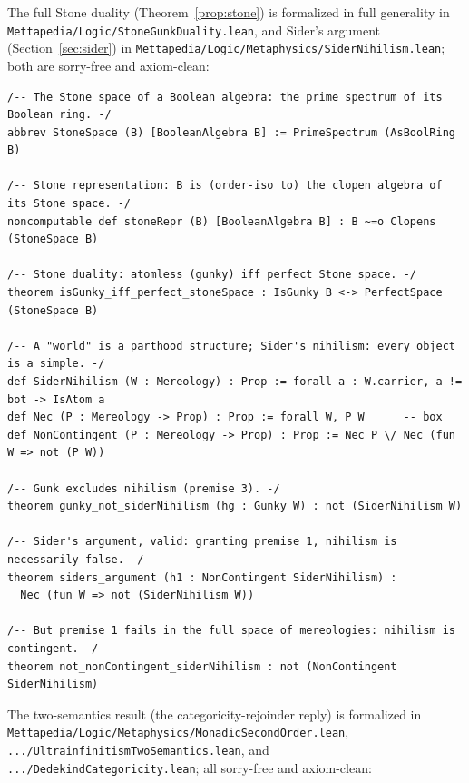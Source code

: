 \documentclass[]{article}
\theoremstyle{definition}
\theoremstyle{remark}
\newcommand{\lpath}[1]{{\ttfamily\nolinkurl{#1}}}
\begin{document}
\noindent The full Stone duality (Theorem~\ref{prop:stone}) is formalized in full
generality in \lpath{Mettapedia/Logic/StoneGunkDuality.lean}, and Sider's argument
(Section~\ref{sec:sider}) in \lpath{Mettapedia/Logic/Metaphysics/SiderNihilism.lean};
both are sorry-free and axiom-clean:

\begin{lstlisting}
/-- The Stone space of a Boolean algebra: the prime spectrum of its Boolean ring. -/
abbrev StoneSpace (B) [BooleanAlgebra B] := PrimeSpectrum (AsBoolRing B)

/-- Stone representation: B is (order-iso to) the clopen algebra of its Stone space. -/
noncomputable def stoneRepr (B) [BooleanAlgebra B] : B ~=o Clopens (StoneSpace B)

/-- Stone duality: atomless (gunky) iff perfect Stone space. -/
theorem isGunky_iff_perfect_stoneSpace : IsGunky B <-> PerfectSpace (StoneSpace B)

/-- A "world" is a parthood structure; Sider's nihilism: every object is a simple. -/
def SiderNihilism (W : Mereology) : Prop := forall a : W.carrier, a != bot -> IsAtom a
def Nec (P : Mereology -> Prop) : Prop := forall W, P W      -- box
def NonContingent (P : Mereology -> Prop) : Prop := Nec P \/ Nec (fun W => not (P W))

/-- Gunk excludes nihilism (premise 3). -/
theorem gunky_not_siderNihilism (hg : Gunky W) : not (SiderNihilism W)

/-- Sider's argument, valid: granting premise 1, nihilism is necessarily false. -/
theorem siders_argument (h1 : NonContingent SiderNihilism) :
  Nec (fun W => not (SiderNihilism W))

/-- But premise 1 fails in the full space of mereologies: nihilism is contingent. -/
theorem not_nonContingent_siderNihilism : not (NonContingent SiderNihilism)
\end{lstlisting}

\noindent The two-semantics result (the categoricity-rejoinder reply) is formalized in
\lpath{Mettapedia/Logic/Metaphysics/MonadicSecondOrder.lean},
\lpath{.../UltrainfinitismTwoSemantics.lean}, and \lpath{.../DedekindCategoricity.lean};
all sorry-free and axiom-clean:
\end{document}
